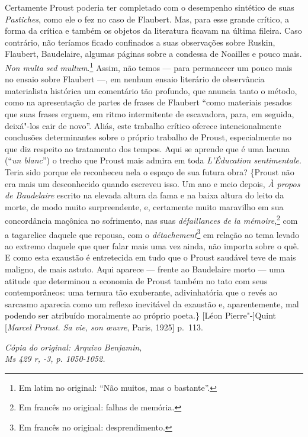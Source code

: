 Certamente Proust poderia ter completado com o desempenho sintético de
suas \emph{Pastiches}, como ele o fez no caso de Flaubert. Mas, para esse
grande crítico, a forma da crítica e também os objetos da literatura
ficavam na última fileira. Caso contrário, não teríamos ficado
confinados a suas observações sobre Ruskin, Flaubert, Baudelaire,
algumas páginas sobre a condessa de Noailles e pouco mais. \emph{Non
multa sed multum}.\footnote{Em latim no original: ``Não muitos,
  mas o bastante''. \versal{[N. T.]}} Assim, não temos --- para permanecer um pouco mais
no ensaio sobre Flaubert ---, em nenhum ensaio literário de observância
materialista histórica um comentário tão profundo, que anuncia tanto o
método, como na apresentação de partes de frases de Flaubert ``como
materiais pesados que suas frases erguem, em ritmo intermitente de
escavadora, para, em seguida, deixá"-los cair de novo''. Aliás, este
trabalho crítico oferece intencionalmente conclusões determinantes sobre
o próprio trabalho de Proust, especialmente no que diz respeito ao
tratamento dos tempos. Aqui se aprende que é uma lacuna (``\emph{un
blanc}'') o trecho que Proust mais admira em toda \emph{L'Éducation
sentimentale}. Teria sido porque ele reconheceu nela o espaço de sua
futura obra? \{Proust não era mais um desconhecido quando escreveu isso.
Um ano e meio depois, \emph{À propos de Baudelaire} escrito na
elevada altura da fama e na baixa altura do leito da morte, de modo muito
surpreendente, e, certamente muito maravilho em sua concordância
maçônica no sofrimento, nas suas \emph{défaillances de la
mémoire},\footnote{Em francês no original: falhas de memória. \versal{[N. T.]}}
com a tagarelice daquele que repousa, com o \emph{détachement}\footnote{Em francês no original: desprendimento. \versal{[N. T.]}} em
relação ao tema levado ao extremo daquele que quer falar mais uma
vez ainda, não importa sobre o quê. E como esta exaustão é entretecida em
tudo que o Proust saudável teve de mais maligno, de mais astuto. Aqui
aparece --- frente ao Baudelaire morto --- uma atitude que determinou a
economia de Proust também no tato com seus contemporâneos: uma ternura
tão exuberante, adivinhatória que o revés ao sarcasmo aparecia como
um reflexo inevitável da exaustão e, aparentemente, mal podendo ser
atribuído moralmente ao próprio poeta.\} {[}Léon Pierre"-{]}Quint
{[}\emph{Marcel Proust. Sa vie, son \oe uvre}, Paris, 1925{]} p.~113.

\begin{flushright}
\emph{\footnotesize{Cópia do original: Arquivo Benjamin,\\ Ms 429 r, -3, p. 1050-1052.}}
\end{flushright}

